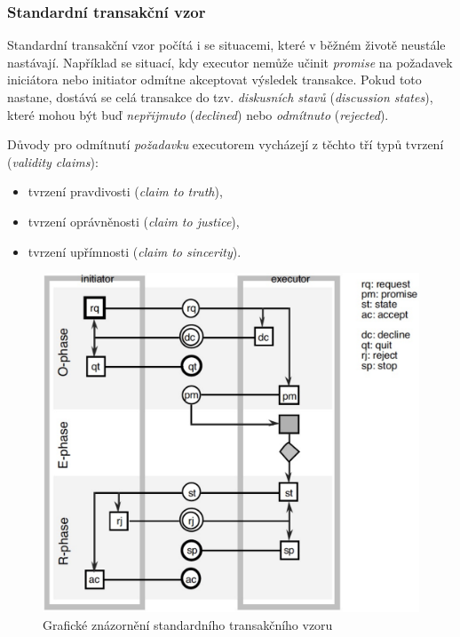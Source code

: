 \subsubsection{Standardní transakční vzor}
Standardní transakční vzor počítá i se situacemi, které v běžném životě neustále nastávají. Například se situací, kdy executor nemůže učinit \textit{promise} na požadavek iniciátora nebo initiator odmítne akceptovat výsledek transakce. Pokud toto nastane, dostává se celá transakce do tzv. \textit{diskusních stavů} (\textit{discussion states}), které mohou být buď \textit{nepřijmuto} (\textit{declined}) nebo \textit{odmítnuto} (\textit{rejected}).

Důvody pro odmítnutí \textit{požadavku} executorem vycházejí z těchto tří typů tvrzení (\textit{validity claims}):

\begin{itemize}
\item tvrzení pravdivosti (\textit{claim to truth}),
\item tvrzení oprávněnosti (\textit{claim to justice}),
\item tvrzení upřímnosti (\textit{claim to sincerity}).
\end{itemize}

\begin{center}
\begin{figure}[H]
\centerline{\includegraphics[scale=0.4]{obrazky/standard-transaction-pattern}}
\caption{Grafické znázornění standardního transakčního vzoru \cite{Dietz2006}}
\label{fig:standard_transaction_pattern}
\end{figure}
\end{center}

